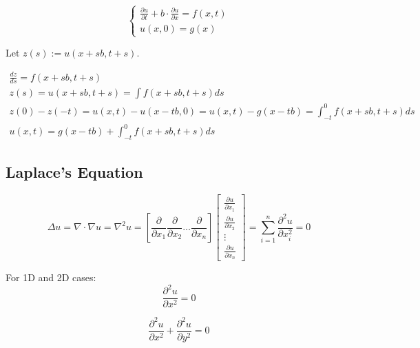 \documentclass{article}
\begin{document}
\begin{proposition}
    \begin{equation*}
        \begin{cases}
            \frac{\partial u}{\partial t} + b \cdot \frac{\partial u}{\partial x} = f(x,t) \\
            u(x,0) = g(x)
        \end{cases}
    \end{equation*}

    Let $z(s) := u(x+sb,t+s)$.

    \begin{gather*}
        \frac{dz}{ds} = f(x+sb,t+s) \\
        z(s) = u(x+sb,t+s) = \int f(x+sb,t+s) ds \\
        z(0) - z(-t) = u(x,t) - u(x-tb,0) = u(x,t) - g(x-tb) = \int_{-t}^{0} f(x+sb,t+s) ds \\
        u(x,t) = g(x-tb) + \int_{-t}^{0} f(x+sb,t+s) ds
    \end{gather*}
\end{proposition}

\subsection{Laplace's Equation}
\begin{definition}
    \begin{equation}
        \label{eq:laplace-equation}
        \Delta u = \nabla \cdot \nabla u = \nabla^{2} u =
        \left[ \frac{\partial}{\partial x_{1}} \frac{\partial}{\partial x_{2}} \dots \frac{\partial}{\partial x_{n}} \right]
        \begin{bmatrix}
            \frac{\partial u}{\partial x_{1}} \\
            \frac{\partial u}{\partial x_{2}} \\
            \vdots                            \\
            \frac{\partial u}{\partial x_{n}}
        \end{bmatrix}
        = \sum_{i=1}^{n} \frac{\partial^{2} u}{\partial x_{i}^{2}} = 0
    \end{equation}
\end{definition}

\begin{example}
    For 1D and 2D cases:
    \begin{equation*}
        \frac{\partial^2 u}{\partial x^{2}} = 0
    \end{equation*}

    \begin{equation*}
        \frac{\partial^2 u}{\partial x^{2}} + \frac{\partial^2 u}{\partial y^{2}} = 0
    \end{equation*}
\end{example}
\end{document}
